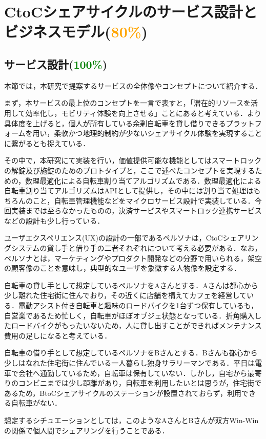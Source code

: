 \section{CtoCシェアサイクルのサービス設計とビジネスモデル(\textcolor{orange}{80\%})}
  \label{sec:CtoCシェアサイクルのサービス設計とビジネスモデル}
      
  \subsection{サービス設計(\textcolor{green}{100\%})}
    \label{sec:サービス設計}
      \par 本節では，本研究で提案するサービスの全体像やコンセプトについて紹介する．
      \par まず，本サービスの最上位のコンセプトを一言で表すと，「潜在的リソースを活用して効率化し，モビリティ体験を向上させる」ことにあると考えている．より具体度を上げると，個人が所有している余剰自転車を貸し借りできるプラットフォームを用い，柔軟かつ地理的制約が少ないシェアサイクル体験を実現することに繋がるとも捉えている．
      \par その中で，本研究にて実装を行い，価値提供可能な機能としてはスマートロックの解錠及び施錠のためのプロトタイプと，ここで述べたコンセプトを実現するための，数理最適化による自転車割り当てアルゴリズムである．数理最適化による自転車割り当てアルゴリズムはAPIとして提供し，その中には割り当て処理はもちろんのこと，自転車管理機能などをマイクロサービス設計で実装している．今回実装までは至らなかったものの，決済サービスやスマートロック連携サービスなどの設計も少し行っている．
      \par ユーザエクスペリエンス(UX)の設計の一部であるペルソナは，CtoCシェアリングシステムの貸し手と借り手の二者それぞれについて考える必要がある．なお，ペルソナとは，マーケティングやプロダクト開発などの分野で用いられる，架空の顧客像のことを意味し，典型的なユーザを象徴する人物像を設定する．
      \par 自転車の貸し手として想定しているペルソナをAさんとする．Aさんは都心から少し離れた住宅街に住んでおり，その近くに店舗を構えてカフェを経営している．電動アシスト付き自転車と趣味のロードバイクを1台ずつ保有しているも，自営業であるため忙しく，自転車がほぼオブジェ状態となっている．折角購入したロードバイクがもったいないため，人に貸し出すことができればメンテナンス費用の足しになると考えている．
      \par 自転車の借り手として想定しているペルソナをBさんとする．Bさんも都心から少しはなれた住宅街に住んでいる一人暮らし独身サラリーマンである．平日は電車で会社へ通勤しているため，自転車は保有していない．しかし，自宅から最寄りのコンビニまでは少し距離があり，自転車を利用したいとは思うが，住宅街であるため，BtoCシェアサイクルのステーションが設置されておらず，利用できる自転車がない．
      \par 想定するシチュエーションとしては，このようなAさんとBさんが双方Win-Winの関係で個人間でシェアリングを行うことである．
  
